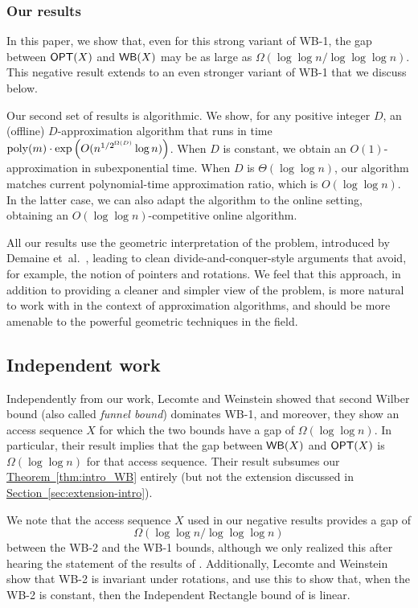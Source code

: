 \documentclass[11pt]{article}
\numberwithin{equation}{section}
\theoremstyle{definition}
\theoremstyle{plain}
\newcommand{\expref}[2]{\hyperref[#2]{#1~\ref{#2}}}
\begin{document}
\subsubsection{Our results} 


In this paper, we show that, even for this strong variant of WB-1, the gap between $\mbox{\sf OPT}(X)$ and $\mathsf{WB}(X)$ may be as large as $\Omega(\log \log n/ \log \log \log n)$.  This negative result extends to an even stronger variant of WB-1 that we discuss below.
%
%


Our second set of results is algorithmic.
We show, for any positive integer $D$, an (offline) $D$-approximation algorithm that runs in time $\operatorname{poly}(m)\cdot \exp\left(O(n^{1/2^{\Omega(D)}}\log n)\right )$. 
When $D$ is constant, we obtain an $O(1)$-approximation in subexponential time. When $D$ is $\Theta(\log \log n)$, our algorithm matches current polynomial-time approximation ratio, which is $O(\log\log n)$. In the latter case, we can also adapt the algorithm to the online setting, obtaining an $O(\log\log n)$-competitive online algorithm.

All our results use the geometric interpretation of the problem, introduced by Demaine et~al.~\cite{DHIKP09}, leading to clean divide-and-conquer-style arguments that avoid, for example, the notion of pointers and rotations.
We feel that this approach, in addition to providing a cleaner and simpler view of the problem, is more natural to work with in the context of approximation algorithms, and should be more amenable to the powerful geometric techniques in the field. 
%
%




\subsection{Independent work}
Independently from our work, Lecomte and Weinstein \cite{LW19} showed that second Wilber bound (also called \emph{funnel bound}) dominates WB-1, and moreover, they show an access sequence $X$ for which the two bounds have a gap of $\Omega(\log\log n)$. 
In particular, their result implies that the gap between $\mathsf{WB}(X)$ and $\mbox{\sf OPT}(X)$ is $\Omega(\log\log n)$ for that access sequence. Their result subsumes our \expref{Theorem}{thm:intro_WB} entirely (but not the extension discussed in \expref{Section}{sec:extension-intro}).    


We note that the access sequence $X$  used in our negative results  provides a gap of
%
\[
\Omega(\log\log n/\log\log\log n)
\]
 between the WB-2 and the WB-1 bounds, although we only realized this after hearing the statement of the results of \cite{LW19}. Additionally, Lecomte and Weinstein show that WB-2 is invariant under rotations, and use this to show that, when the WB-2 is constant, then the Independent Rectangle bound of \cite{DHIKP09} is linear.
\end{document}
